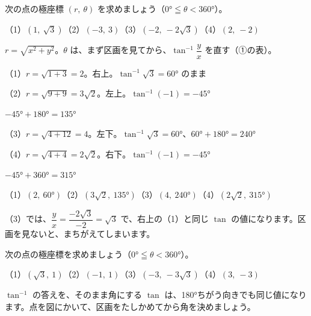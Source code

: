 \begin{reidai}
次の点の極座標 $(r,\ \theta)$ を求めましょう（$0°\leqq\theta<360°$）。\par
（1）$(1,\ \sqrt3)$\quad（2）$(-3,\ 3)$\quad（3）$(-2,\ -2\sqrt3)$\quad（4）$(2,\ -2)$\par
\kangaekata $r=\sqrt{x^2+y^2}$。$\theta$ は、まず区画を見てから、$\tan^{-1}\dfrac{y}{x}$ を直す（①の表）。\par
\shiki（1）$r=\sqrt{1+3}=2$。右上。$\tan^{-1}\sqrt3=60°$ のまま\par
\hspace*{2.6\zw}（2）$r=\sqrt{9+9}=3\sqrt2$。左上。$\tan^{-1}(-1)=-45°$\par
\hspace*{4.6\zw}$-45°+180°=135°$\par
\hspace*{2.6\zw}（3）$r=\sqrt{4+12}=4$。左下。$\tan^{-1}\sqrt3=60°$、$60°+180°=240°$\par
\hspace*{2.6\zw}（4）$r=\sqrt{4+4}=2\sqrt2$。右下。$\tan^{-1}(-1)=-45°$\par
\hspace*{4.6\zw}$-45°+360°=315°$\par
\kotae （1）$(2,\ 60°)$\quad（2）$(3\sqrt2,\ 135°)$\quad（3）$(4,\ 240°)$\quad（4）$(2\sqrt2,\ 315°)$
\end{reidai}
（3）では、$\dfrac{y}{x}=\dfrac{-2\sqrt3}{-2}=\sqrt3$ で、右上の（1）と同じ $\tan$ の値になります。区画を見ないと、まちがえてしまいます。

\begin{jibun}
次の点の極座標を求めましょう（$0°\leqq\theta<360°$）。\par
（1）$(\sqrt3,\ 1)$\quad（2）$(-1,\ 1)$\quad（3）$(-3,\ -3\sqrt3)$\quad（4）$(3,\ -3)$
\end{jibun}

\begin{tsumazuki}{$\tan^{-1}$ の答えを、そのまま角にする}
$\tan$ は、180°ちがう向きでも同じ値になります。点を図にかいて、区画をたしかめてから角を決めましょう。
\end{tsumazuki}

